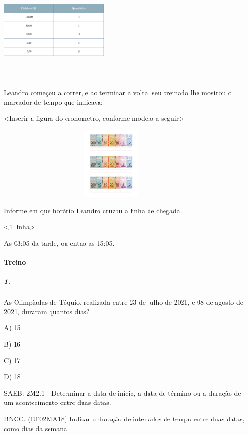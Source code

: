 \includegraphics[width=2.14583in,height=2.10113in]{media/image66.png}

Leandro começou a correr, e ao terminar a volta, seu treinado lhe
mostrou o marcador de tempo que indicava:

\textless{}Inserir a figura do cronometro, conforme modelo a
seguir\textgreater{}

\includegraphics[width=4.61458in,height=1.43750in]{media/image67.png}

Informe em que horário Leandro cruzou a linha de chegada.

\textless{}1 linha\textgreater{}

As 03:05 da tarde, ou então as 15:05.

\paragraph{Treino}\label{treino-3}

\subparagraph{1.}\label{section-54}

As Olimpíadas de Tóquio, realizada entre 23 de julho de 2021, e 08 de
agosto de 2021, duraram quantos dias?

A) 15

B) 16

C) 17

D) 18

SAEB: 2M2.1 - Determinar a data de início, a data de término ou a
duração de um acontecimento entre duas datas.

BNCC: (EF02MA18) Indicar a duração de intervalos de tempo entre duas
datas, como dias da semana

